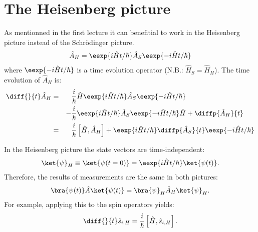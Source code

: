\section{The Heisenberg picture}
As mentionned in the first lecture it can benefitial to work in the Heisenberg picture instead of the Schrödinger picture.
\begin{align}
						\hat{A}_H=\eexp{i{\hat{H} t}/{\hbar}} \hat{A}_S \eexp{-i{\hat{H} t}/{\hbar}}
					\end{align}
					where $\eexp{-i{\hat{H} t}/{\hbar}}$ is a time evolution operator (N.B.: $\hat{H}_S = \hat{H}_H$). The time evolution of $\hat{A}_H$ is:
					\begin{align}
						\notag \diff{}{t} \hat{A}_H &=&& \frac{i}{\hbar}\hat{H}\eexp{i{\hat{H}t}/{\hbar}}\hat{A}_S \eexp{-i{\hat{H} t}/{\hbar}}\\ 
						&&-&\frac{i}{\hbar} \eexp{i{\hat{H} t}/{\hbar}}\hat{A}_S \eexp{-i{\hat{H}t}/{\hbar}}\hat{H}+\diffp{\hat{A}_H}{t}\\
						&=&& \frac{i}{\hbar}\left[\hat{H},\hat{A}_H\right] + \eexp{i{\hat{H}t}/{\hbar}}\diffp{\hat{A}_S}{t}\eexp{-i{\hat{H}t}/{\hbar}}
					\end{align}

					In the Heisenberg picture the state vectors are time-in\-de\-pen\-dent:
					\begin{align}
						\ket{\psi}_H \equiv \ket{\psi(t=0)}=\eexp{i{\hat{H}}t/{\hbar}} \ket{\psi(t)}.
					\end{align}
					Therefore, the results of measurements are the same in both pictures:
					\begin{align}
						\bra{\psi(t)}\hat{A}\ket{\psi(t)} = \bra{\psi}_H \hat{A}_H \ket{\psi}_H.
					\end{align}
					For example, applying this to the spin operators yields:
					\begin{align}
						\diff{}{t}\hat{s}_{i,H}=\frac{i}{\hbar}\left[\hat{H},\hat{s}_{i,H}\right].
					\end{align}
